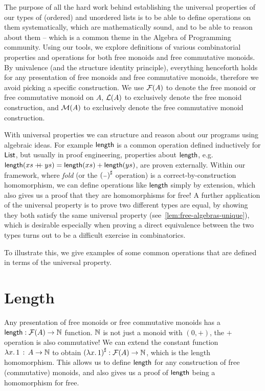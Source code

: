 \label{sec:combinatorics}

The purpose of all the hard work behind establishing the universal properties of our types of (ordered) and unordered
lists is to be able to define operations on them systematically, which are mathematically sound, and to be able to
reason about them -- which is a common theme in the Algebra of Programming~\cite{birdAlgebraProgramming1997} community.
%
Using our tools, we explore definitions of various combinatorial properties and operations for both
free monoids and free commutative monoids.
%
By univalence (and the structure identity principle), everything henceforth holds for any presentation of free monoids
and free commutative monoids, therefore we avoid picking a specific construction.
%
We use $\mathcal{F}(A)$ to denote the free monoid or free commutative monoid on $A$, $\mathcal{L}(A)$ to exclusively denote the free
monoid construction, and $\mathcal{M}(A)$ to exclusively denote the free commutative monoid construction.

With universal properties we can structure and reason about our programs using algebraic ideas.
%
For example $\operatorname{\mathsf{length}}$ is a common operation defined inductively for $\operatorname{\mathsf{List}}$,
but usually in proof engineering, properties about $\operatorname{\mathsf{length}}$, e.g.
$\operatorname{\mathsf{length}}(xs \mathbin{+\kern -0.4em+} ys) = \operatorname{\mathsf{length}}(xs) + \operatorname{\mathsf{length}}(ys)$,
are proven externally.
%
Within our framework, where \emph{fold} (or the ${({\scriptstyle{-}})}^{\sharp}$ operation) is a correct-by-construction homomorphism,
we can define operations like $\operatorname{\mathsf{length}}$ simply by extension,
which also gives us a proof that they are homomorphisms for free!
%
A further application of the universal property is to prove two different types are equal, by showing they both satisfy
the same universal property (see~\cref{lem:free-algebras-unique}), which is desirable especially when proving a direct
equivalence between the two types turns out to be a difficult exercise in combinatorics.

To illustrate this, we give examples of some common operations that are defined in terms of the universal property.

\section{Length}

Any presentation of free monoids or free commutative monoids has a $\operatorname{\mathsf{length}} : \mathcal{F}(A) \to \mathbb{N}$ function.
%
$\mathbb{N}$ is not just a monoid with $(0,+)$, the $+$ operation is also commutative!
%
We can extend the constant function $\lambda x.\, 1\,:\,A \to \mathbb{N}$
to obtain ${(\lambda x.\, 1)}^{\sharp} : \mathcal{F}(A) \to \mathbb{N}$, which is the length homomorphism.
%
This allows us to define $\operatorname{\mathsf{length}}$ for any construction of free (commutative) monoids,
and also gives us a proof of $\operatorname{\mathsf{length}}$ being a homomorphism for free.

